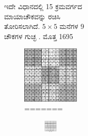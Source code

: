 \begin{figure}[H]
\begin{figure}[H]
\begin{figure}[h]
\begin{figure}[h]
\begin{itemize}
	ಇದೇ ವಿಧಾನದಲ್ಲಿ 15 ಕ್ರಮವರ್ಗದ ಮಾಯಾಚೌಕವನ್ನು ರಚಿಸಿ ತೋರಿಸಲಾಗಿದೆ. $5 \times 5$ ಮನೆಗಳ 9 ಚೌಕಗಳ ಗುಚ್ಛ . ಮೊತ್ತ 1695
	\begin{figure}[H]
	\includegraphics{src/figures/chap3/fig3-37.eps}
=======
\newpage
	\begin{figure}[H]
	\includegraphics[scale=.8]{src/figures/chap3/fig3.35.jpg}
	\end{figure}


\end{figure}
\end{itemize}
\end{figure}
\end{figure}
\end{figure}
\end{figure}
